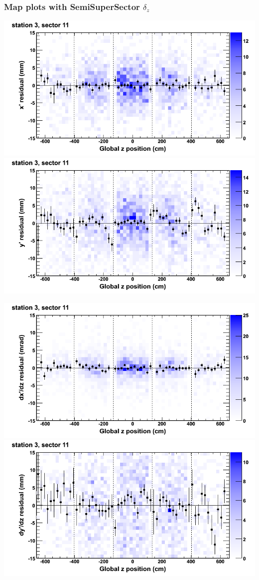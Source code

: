 \documentclass[compress]{beamer}
\begin{document}
\begin{frame}
\frametitle{Map plots with SemiSuperSector $\delta_z$}
\includegraphics[width=0.5\linewidth]{zfit_mapplots/DTvsz_st3sec11_x.png}
\includegraphics[width=0.5\linewidth]{zfit_mapplots/DTvsz_st3sec11_y.png}

\includegraphics[width=0.5\linewidth]{zfit_mapplots/DTvsz_st3sec11_dxdz.png}
\includegraphics[width=0.5\linewidth]{zfit_mapplots/DTvsz_st3sec11_dydz.png}
\end{frame}
\end{document}
